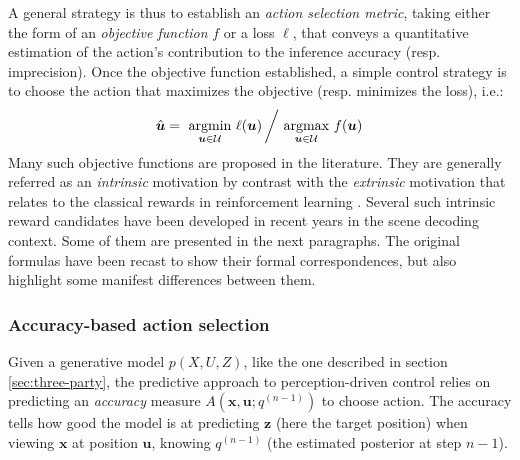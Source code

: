 \documentclass[12pt,twoside,openright]{article}
\begin{document}
A general strategy is thus to establish an {\color{Purple} \emph{action selection metric}, taking either the form of an \emph{objective function} $f$ or a loss $\ell$}, that conveys a quantitative estimation of the action's contribution to the inference accuracy (resp. imprecision). Once the objective function established, a simple control strategy is to choose the action that maximizes the objective (resp. minimizes the loss), i.e.:
\begin{align}
\hat{\boldsymbol{u}} = \underset{\boldsymbol{u}\in\mathcal{U}}{\text{ argmin }}  \ell(\boldsymbol{u})\left/ \underset{\boldsymbol{u}\in\mathcal{U}}{\text{ argmax }}  f(\boldsymbol{u})\right.
\end{align}
Many such objective functions are proposed in the literature. They are generally referred as an \emph{intrinsic} motivation \citep{oudeyer2008can} by contrast with the \emph{extrinsic} motivation that relates to the classical rewards in reinforcement learning \citep{sutton1998reinforcement}. {\color{Purple} Several such intrinsic reward candidates have been developed in recent years in the scene decoding context. Some of them are presented in the next paragraphs. The original formulas have been recast to show their formal correspondences, but also highlight some manifest differences between them.}

\subsubsection{Accuracy-based action selection}\label{sec:infomax}

Given a generative model $p(X,U,Z)$, like the one described in section \ref{sec:three-party}, the predictive approach to perception-driven control \citep{najemnik2005optimal} relies on predicting an \emph{accuracy} measure $A(\boldsymbol{x}, \boldsymbol{u}; q^{(n-1)})$ to choose action. 
The accuracy tells how good the model is at predicting $\boldsymbol{z}$ (here the target position) when viewing $\boldsymbol{x}$ at position $\boldsymbol{u}$,
knowing $q^{(n-1)}$ (the estimated posterior at step $n-1$).
\end{document}
